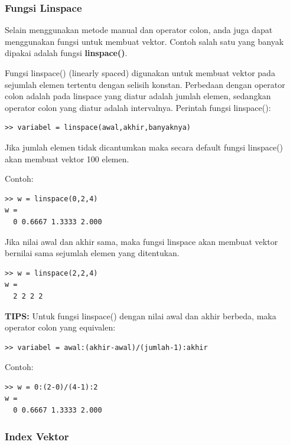\documentclass[12pt]{book}
\begin{document}
	\subsubsection{Fungsi Linspace}

	Selain menggunakan metode manual dan operator colon, anda juga dapat menggunakan fungsi untuk membuat vektor.
	Contoh salah satu yang banyak dipakai adalah fungsi \textbf{linspace()}.
	
	Fungsi linspace() (linearly spaced) digunakan untuk membuat vektor pada sejumlah elemen tertentu dengan selisih konstan.
	Perbedaan dengan operator colon adalah pada linspace yang diatur adalah jumlah elemen, sedangkan operator colon yang diatur adalah intervalnya.
	Perintah fungsi linspace():
	\begin{verbatim}
>> variabel = linspace(awal,akhir,banyaknya)
	\end{verbatim}
		
	Jika jumlah elemen tidak dicantumkan maka secara default fungsi linspace() akan membuat vektor 100 elemen.
	
	Contoh:
	\begin{verbatim}
>> w = linspace(0,2,4)
w = 
  0 0.6667 1.3333 2.000
	\end{verbatim}

	Jika nilai awal dan akhir sama, maka fungsi linspace akan membuat vektor bernilai sama sejumlah elemen yang ditentukan.
	\begin{verbatim}
>> w = linspace(2,2,4)
w = 
  2 2 2 2
	\end{verbatim}

	\textbf{TIPS:} Untuk fungsi linspace() dengan nilai awal dan akhir berbeda, maka operator colon yang equivalen:
	\begin{verbatim}
>> variabel = awal:(akhir-awal)/(jumlah-1):akhir 
	\end{verbatim}

	\newpage
	Contoh:
	\begin{verbatim}
>> w = 0:(2-0)/(4-1):2
w = 
  0 0.6667 1.3333 2.000
	\end{verbatim}

	\subsubsection{Index Vektor}
	
\end{document}
